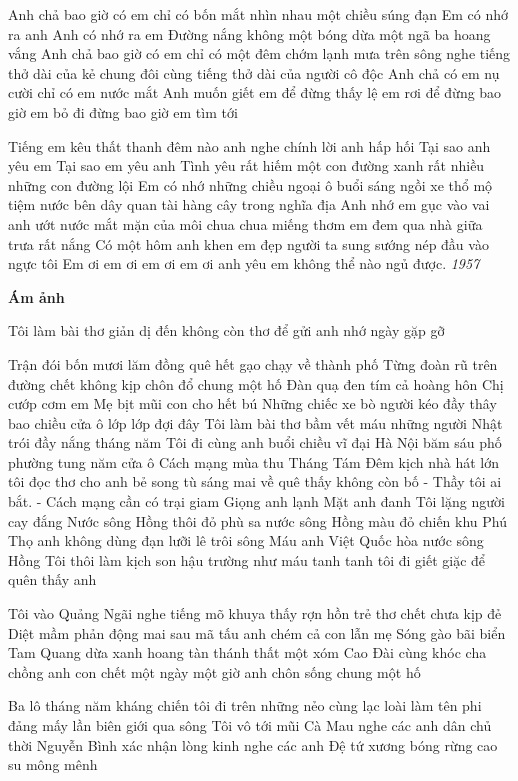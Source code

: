 \documentclass[../main.tex]{subfiles}
\begin{document}
\begin{multicols}{2}
Anh chả bao giờ có em 
chỉ có bốn mắt nhìn nhau một chiều súng đạn 
Em có nhớ ra anh 
Anh có nhớ ra em 
Đường nắng không một bóng dừa 
một ngã ba hoang vắng 
Anh chả bao giờ có em 
chỉ có một đêm chớm lạnh 
mưa trên sông 
nghe tiếng thở dài của kẻ chung đôi 
cùng tiếng thở dài của người cô độc 
Anh chả có em nụ cười 
chỉ có em nước mắt 
Anh muốn giết em để đừng thấy lệ em rơi 
để đừng bao giờ em bỏ đi 
đừng bao giờ em tìm tới 
 
Tiếng em kêu thất thanh đêm nào 
anh nghe chính lời anh hấp hối 
Tại sao anh yêu em 
Tại sao em yêu anh 
Tình yêu rất hiếm một con đường xanh 
rất nhiều những con đường lội 
Em có nhớ những chiều ngoại ô 
buổi sáng ngồi xe thổ mộ 
tiệm nước bên dây quan tài 
hàng cây trong nghĩa địa  
Anh nhớ em gục vào vai anh ướt 
nước mắt mặn của môi 
chua chua miếng thơm em đem qua nhà giữa trưa rất nắng 
Có một hôm anh khen em đẹp 
người ta sung sướng nép đầu vào ngực tôi 
Em ơi em ơi em ơi em ơi 
anh yêu em không thể nào ngủ được. 
\textit{1957} 
 
 
\textbf{Ám ảnh} 
 
Tôi làm bài thơ giản dị 
đến không còn thơ 
để gửi anh nhớ ngày gặp gỡ        
 
Trận đói bốn mươi lăm 
đồng quê hết gạo chạy về thành phố 
Từng đoàn rũ trên đường 
chết không kịp chôn 
đổ chung một hố 
Đàn quạ đen tím cả hoàng hôn 
Chị cướp cơm em 
Mẹ bịt mũi con cho hết bú 
Những chiếc xe bò người kéo đầy thây 
bao chiều cửa ô lớp lớp đợi đây 
Tôi làm bài thơ bầm vết máu 
những người Nhật trói đầy nắng tháng năm 
Tôi đi cùng anh 
buổi chiều vĩ đại  
Hà Nội băm sáu phố phường 
tung năm cửa ô 
Cách mạng mùa thu Tháng Tám 
Đêm kịch nhà hát lớn 
tôi đọc thơ cho anh bẻ song tù 
sáng mai về quê thấy không còn bố 
- Thầy tôi ai bắt. 
- Cách mạng cần có trại giam 
Giọng anh lạnh 
Mặt anh đanh 
Tôi lặng người cay đắng 
Nước sông Hồng thôi đỏ phù sa 
nước sông Hồng màu đỏ chiến khu Phú Thọ 
anh không dùng đạn 
lưỡi lê 
trôi sông 
Máu anh Việt Quốc hòa nước sông Hồng  
Tôi thôi làm kịch 
son hậu trường như máu tanh tanh 
tôi đi giết giặc để quên thấy anh 
 
Tôi vào Quảng Ngãi nghe tiếng mõ khuya 
thấy rợn hồn trẻ thơ chết chưa kịp đẻ 
Diệt mầm phản động mai sau 
mã tấu 
anh chém cả con lẫn mẹ 
Sóng gào bãi biển Tam Quang 
dừa xanh hoang tàn thánh thất 
một xóm Cao Đài cùng khóc 
cha 
chồng 
anh 
con 
chết một ngày 
một giờ 
anh chôn sống chung một hố 
 
Ba lô tháng năm kháng chiến 
tôi đi trên những nẻo cùng 
lạc loài làm tên phi đảng 
mấy lần biên giới qua sông 
Tôi vô tới mũi Cà Mau 
nghe các anh dân chủ 
thời Nguyễn Bình 
xác nhận lòng kinh 
nghe các anh Đệ tứ 
xương bóng rừng cao su mông mênh 
 

\end{multicols}
\end{document}
